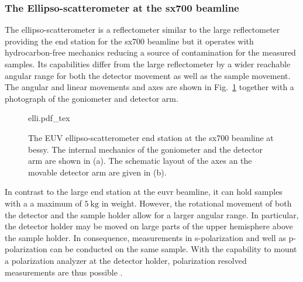 \subsubsection{The Ellipso-scatterometer at the \gls{sx700} beamline}
The ellipso-scatterometer is a reflectometer similar to the large reflectometer providing the end station for the \gls{sx700} beamline but it operates with hydrocarbon-free mechanics reducing a source of contamination for the measured samples. Its capabilities differ from the large reflectometer by a wider reachable angular range for both the detector movement as well as the sample movement. The angular and linear movements and axes are shown in Fig.~\ref{ch_exp:fig_elli} together with a photograph of the goniometer and detector arm.
\begin{figure}[htb]
    \def\svgwidth{\textwidth}
    {elli.pdf_tex}
    \caption[The EUV ellipso-scatterometer end station at the SX700 beamline.]{The EUV ellipso-scatterometer end station at the \gls{sx700} beamline at \gls{bessy}. The internal mechanics of the goniometer and the detector arm are shown in (a). The schematic layout of the axes an the movable detector arm are given in (b).}
    \label{ch_exp:fig_elli}
\end{figure}
In contrast to the large end station at the \gls{euvr} beamline, it can hold samples with a a maximum of $\SI{5}{\kg}$ in weight. However, the rotational movement of both the detector and the sample holder allow for a larger angular range. In particular, the detector holder may be moved on large parts of the upper hemisphere above the sample holder. In consequence, measurements in s-polarization and well as p-polarization can be conducted on the same sample. With the capability to mount a polarization analyzer at the detector holder, polarization resolved measurements are thus possible \cite{soltwisch_polarization_2015}.

